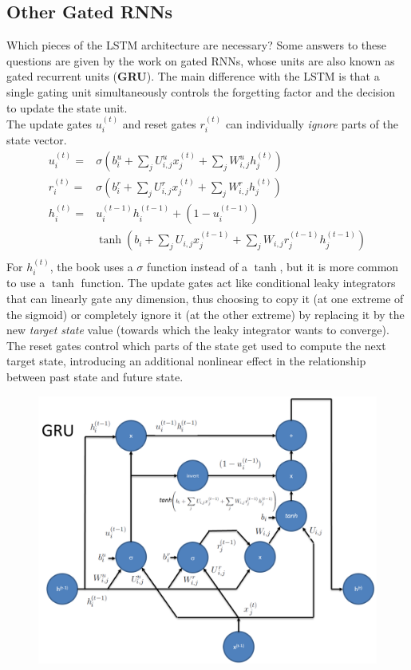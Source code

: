 \begin{multicols}{2}
	\subsection{Other Gated RNNs}
	Which pieces of the LSTM architecture are necessary?
	Some answers to these questions are given by the work on gated RNNs, whose units are also known as gated recurrent units (\textbf{GRU}).
	The main difference with the LSTM is that a single gating unit simultaneously controls the forgetting factor and the decision to update the state unit.\\

	The update gates $u_i^{(t)}$ and reset gates $r_i^{(t)}$ can individually \emph{ignore} parts of the state vector.
	\begin{align*}
	u_i^{(t)} =& \sigma\left( b_i^u+\sum_j U_{i,j}^ux_j^{(t)}+\sum_j W_{i,j}^uh_j^{(t)} \right)\\
	r_i^{(t)} =& \sigma\left( b_i^r+\sum_j U_{i,j}^rx_j^{(t)}+\sum_j W_{i,j}^rh_j^{(t)} \right)\\
	h_i^{(t)} =& u_i^{(t-1)}h_i^{(t-1)} +(1-u_i^{(t-1)}) \\
	&\tanh \left( b_i+\sum_j U_{i,j}x_j^{(t-1)}+\sum_j W_{i,j}r_j^{(t-1)}h_j^{(t-1)} \right)\\
	\end{align*}
	\columnbreak
  For $h_i^{(t)}$, the book uses a $\sigma$ function instead of a $\tanh$, but it is more common to use a $\tanh$ function.
	The update gates act like conditional leaky integrators that can linearly gate any dimension, thus choosing to copy it (at one extreme of the sigmoid) or completely ignore it (at the other extreme) by replacing it by the new \emph{target state} value (towards which the leaky integrator wants to converge).
	The reset gates control which parts of the state get used to compute the next target state, introducing an additional nonlinear effect in the relationship between past state and future state.
	\begin{figure}[H]
		\centering
		\includegraphics[width=1.05\linewidth]{images/gru.PNG}
	\end{figure}

\end{multicols}
\newpage
